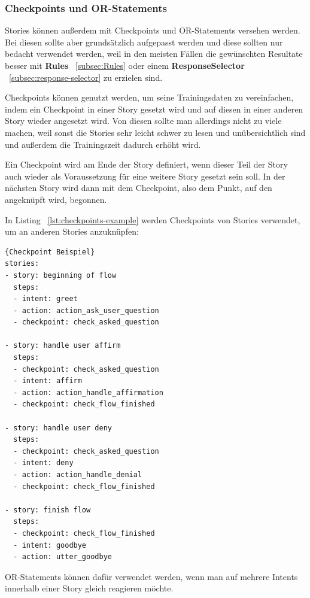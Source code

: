 \subsubsection{Checkpoints und OR-Statements}\label{subsubsec:Checkpoints}

Stories können außerdem mit Checkpoints und OR-Statements versehen werden.
Bei diesen sollte aber grundsätzlich aufgepasst werden und diese sollten nur bedacht verwendet werden, weil in den meisten Fällen die gewünschten Resultate besser mit \textbf{Rules} ~\ref{subsec:Rules} oder einem \textbf{ResponseSelector} ~\ref{subsec:response-selector} zu erzielen sind.\cite{checkpointsor}

Checkpoints können genutzt werden, um seine Trainingsdaten zu vereinfachen, indem ein Checkpoint in einer Story gesetzt wird und auf diesen in einer anderen Story wieder angesetzt wird.
Von diesen sollte man allerdings nicht zu viele machen, weil sonst die Stories sehr leicht schwer zu lesen und unübersichtlich sind und außerdem die Trainingszeit dadurch erhöht wird.\cite{checkpoints}

Ein Checkpoint wird am Ende der Story definiert, wenn dieser Teil der Story auch wieder als Voraussetzung für eine weitere Story gesetzt sein soll.
In der nächsten Story wird dann mit dem Checkpoint, also dem Punkt, auf den angeknüpft wird, begonnen.

In Listing ~\ref{lst:checkpoints-example} werden Checkpoints von Stories verwendet, um an anderen Stories anzuknüpfen\cite{checkpoints}:

\begin{lstlisting}[label={lst:checkpoints-example},caption={Checkpoints Beispiel}]{Checkpoint Beispiel}
stories:
- story: beginning of flow
  steps:
  - intent: greet
  - action: action_ask_user_question
  - checkpoint: check_asked_question

- story: handle user affirm
  steps:
  - checkpoint: check_asked_question
  - intent: affirm
  - action: action_handle_affirmation
  - checkpoint: check_flow_finished

- story: handle user deny
  steps:
  - checkpoint: check_asked_question
  - intent: deny
  - action: action_handle_denial
  - checkpoint: check_flow_finished

- story: finish flow
  steps:
  - checkpoint: check_flow_finished
  - intent: goodbye
  - action: utter_goodbye
\end{lstlisting}

OR-Statements können dafür verwendet werden, wenn man auf mehrere Intents innerhalb einer Story gleich reagieren möchte.\cite{orStatements}

